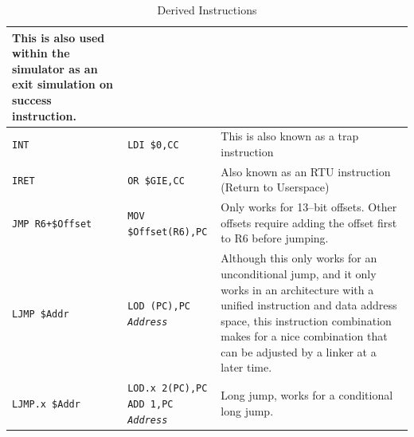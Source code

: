 \documentclass{gqtekspec}
\begin{document}
\begin{table}
\begin{center}
\begin{tabular}{p{1.4in}p{1.5in}p{3in}}
	This is also used within the simulator as an exit simulation on
	success instruction.\\\hline
{\tt INT } & {\tt LDI \$0,CC} & This is also known as a trap instruction\\\hline
{\tt IRET}
	& {\tt OR \$GIE,CC}
	& Also known as an RTU instruction (Return to Userspace) \\\hline
{\tt JMP R6+\$Offset}
	& {\tt MOV \$Offset(R6),PC}
	& Only works for 13--bit offsets.  Other offsets require adding the
	offset first to R6 before jumping.\\\hline
{\tt LJMP \$Addr}
	& \parbox[t]{1.5in}{\tt LOD (PC),PC \\ {\em Address }}
	& Although this only works for an unconditional jump, and it only
	works in an architecture with a unified instruction and data address
	space, this instruction combination makes for a nice combination that
	can be adjusted by a linker at a later time.\\\hline
{\tt LJMP.x \$Addr}
	& \parbox[t]{1.5in}{\tt LOD.x 2(PC),PC \\ ADD 1,PC \\ {\em Address }}
	& Long jump, works for a conditional long jump.  \\\hline
\end{tabular}
\caption{Derived Instructions}\label{tbl:derived-1}
\end{center}\end{table}
\end{document}

